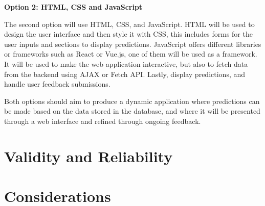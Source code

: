 \textbf{Option 2: HTML, CSS and JavaScript}


The second option will use HTML, CSS, and JavaScript. HTML will be used to design the user interface and then style it with CSS, this includes forms for the user inputs and sections to display predictions.  JavaScript offers different libraries or frameworks such as React or Vue.js, one of them will be used as a framework. It will be used to make the web application interactive, but also to fetch data from the backend using AJAX or Fetch API. Lastly, display predictions, and handle user feedback submissions.


Both options should aim to produce a dynamic application where predictions can be made based on the data stored in the database, and where it will be presented through a web interface and refined through ongoing feedback.

\section{Validity and Reliability}

\section{Considerations}